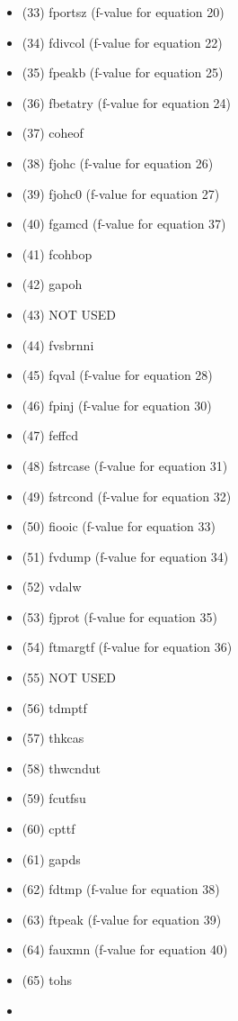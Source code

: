 \documentclass[]{article}
\begin{document}
\begin{itemize}
\begin{itemize}
  \item
    (33) fportsz (f-value for equation 20)
  \item
    (34) fdivcol (f-value for equation 22)
  \item
    (35) fpeakb (f-value for equation 25)
  \item
    (36) fbetatry (f-value for equation 24)
  \item
    (37) coheof
  \item
    (38) fjohc (f-value for equation 26)
  \item
    (39) fjohc0 (f-value for equation 27)
  \item
    (40) fgamcd (f-value for equation 37)
  \item
    (41) fcohbop
  \item
    (42) gapoh
  \item
    (43) NOT USED
  \item
    (44) fvsbrnni
  \item
    (45) fqval (f-value for equation 28)
  \item
    (46) fpinj (f-value for equation 30)
  \item
    (47) feffcd
  \item
    (48) fstrcase (f-value for equation 31)
  \item
    (49) fstrcond (f-value for equation 32)
  \item
    (50) fiooic (f-value for equation 33)
  \item
    (51) fvdump (f-value for equation 34)
  \item
    (52) vdalw
  \item
    (53) fjprot (f-value for equation 35)
  \item
    (54) ftmargtf (f-value for equation 36)
  \item
    (55) NOT USED
  \item
    (56) tdmptf
  \item
    (57) thkcas
  \item
    (58) thwcndut
  \item
    (59) fcutfsu
  \item
    (60) cpttf
  \item
    (61) gapds
  \item
    (62) fdtmp (f-value for equation 38)
  \item
    (63) ftpeak (f-value for equation 39)
  \item
    (64) fauxmn (f-value for equation 40)
  \item
    (65) tohs
  \item

\end{itemize}
\end{itemize}
\end{document}
